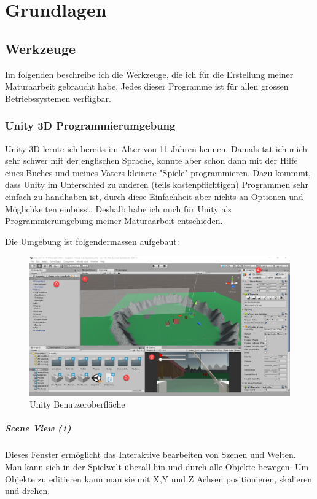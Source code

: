 \chapter{Grundlagen}

\section{Werkzeuge}
Im folgenden beschreibe ich die Werkzeuge, die ich für die Erstellung meiner Maturaarbeit gebraucht habe.
Jedes dieser Programme ist für allen grossen Betriebssystemen verfügbar.
\subsection{Unity 3D Programmierumgebung}

Unity 3D lernte ich bereits im Alter von 11 Jahren kennen.
Damals tat ich mich sehr schwer mit der englischen Sprache, konnte aber schon dann mit der Hilfe eines Buches und meines Vaters kleinere "Spiele" programmieren.
Dazu kommmt, dass Unity im Unterschied zu anderen (teils kostenpflichtigen) Programmen sehr einfach zu handhaben ist, durch diese Einfachheit aber nichts an Optionen und Möglichkeiten einbüsst.
Deshalb habe ich mich für Unity als Programmierumgebung meiner Maturaarbeit entschieden.


Die Umgebung ist folgendermassen aufgebaut:

\begin{figure}[H]
\includegraphics[scale=0.4]{screenshots/unityide.png}
\caption{Unity Benutzeroberfläche}
\end{figure}

\paragraph{Scene View (1)}
Dieses Fenster ermöglicht das Interaktive bearbeiten von Szenen und Welten.
Man kann sich in der Spielwelt überall hin und durch alle Objekte bewegen. Um Objekte zu editieren kann man sie mit X,Y und Z Achsen positionieren,
skalieren und drehen.

